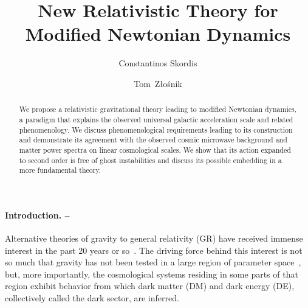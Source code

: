 \documentclass[twocolumn,prl,preprintnumbers,amsmath,amssymb,nofootinbib]{revtex4-2}
\begin{document}
	
\title{New Relativistic Theory for Modified Newtonian Dynamics}

\author{Constantinos Skordis}
\author{Tom~Z\l o\'{s}nik}


\begin{abstract}
We propose a relativistic gravitational theory leading to modified Newtonian dynamics, a paradigm that explains
the observed universal galactic acceleration scale and related phenomenology.
We discuss phenomenological requirements leading to its construction and demonstrate its agreement
with the observed cosmic microwave background and matter power spectra on linear cosmological scales.
We show that its action expanded to second order is free of ghost instabilities and discuss its possible embedding in a more fundamental theory. 
\end{abstract}

 
\maketitle

\paragraph{Introduction. --}
Alternative theories of gravity to general relativity (GR) have received immense interest in the past 20 years 
or so~\cite{Jain:2010ka,Clifton:2011jh}. The driving force behind this interest is not so much that gravity has not 
been tested  in a large region of parameter space~\cite{BakerPsaltisSkordis2014}, but, more importantly, 
 the cosmological systems residing in some parts of that region exhibit behavior from which dark matter (DM) and dark energy (DE), collectively called the dark sector, 
are inferred.
\end{document}
